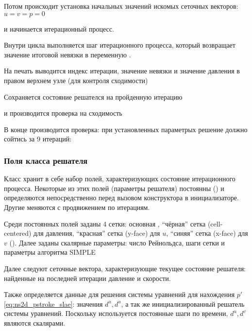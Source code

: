 Потом происходит установка начальных значений искомых сеточных векторов: $u=v=p=0$

и начинается итерационный процесс.

Внутри цикла
выполняется шаг итерационного процесса, который
возвращает значение итоговой невязки в переменную .

На печать выводится индекс итерации, значение невязки и значение давления в правом верхнем узле (для контроля сходимости)

Сохраняется состояние решателся на пройденную итерацию

и производится проверка на сходимость

В конце производится проверка: при установленных параметрых решение
должно сойтись за 9 итераций:

\subsubsection{Поля класса решателя}
Класс  хранит в себе набор полей,
характеризующих состояние итерационного процесса.
Некоторые из этих полей (параметры решателя) постоянны () и
определяются непосредственно перед вызовом конструктора в инициализаторе. Другие
меняются с продвижением по итерациям.

Среди постоянных полей заданы 4 сетки: основная ,
``чёрная'' сетка  (cell-centered) для давления,
``красная'' сетка  (y-face) для $u$,
``синяя'' сетка  (x-face) для $v$ ().
Далее заданы скалярные параметры: число Рейнольдса, шаги сетки и параметры алгоритма SIMPLE

Далее следуют сеточные вектора, характеризующие текущее состояние решателя:
найденные на последней итерации давление и скорости.

Также определяется данные для решения системы уравнений для нахождения $p'$ \eqref{eq:ns2d_pstroke_slae}:
значения $d^u, d^u$, а так же инициализированный решатель системы уравнений.
Поскольку используется постоянные шаги по времени, $d^u, d^v$ являются скалярами.

